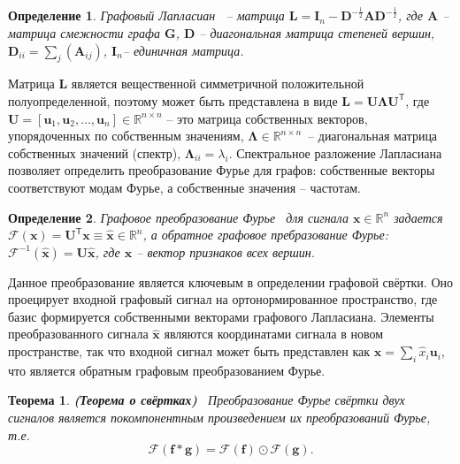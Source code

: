 \documentclass[14pt]{extarticle}
\newtheorem{Th}{Теорема}
\newtheorem{Def}{Определение}
\begin{document}
\begin{Def}
	\textit{Графовый Лапласиан}~\cite{Chung:1997} -- матрица $\mathbf{L}=\mathbf{I}_{n}-\mathbf{D}^{-\frac{1}{2}} \mathbf{A} \mathbf{D}^{-\frac{1}{2}}$, где $\mathbf{A}$ -- матрица смежности графа $\mathbf{G}$,  $\mathbf{D}$ -- диагональная матрица степеней вершин, $\mathbf{D}_{i i}=\sum_{j}\left(\mathbf{A}_{i j}\right)$, $\mathbf{I}_{n}$-- единичная матрица.
\end{Def}

Матрица $\mathbf{L}$ является вещественной симметричной положительной полуопределенной, поэтому может быть представлена в виде  $\mathbf{L}=\mathbf{U} \boldsymbol{\Lambda} \mathbf{U}^{\mathsf{T}} $, где $\mathbf{U}=\left[\mathbf{u}_{1}, \mathbf{u}_{2}, \dots, \mathbf{u}_n\right] \in \mathbb{R}^{n \times n}$ -- это матрица собственных векторов, упорядоченных по собственным значениям, $\boldsymbol{\Lambda} \in \mathbb{R}^{n \times n}$~-- диагональная матрица собственных значений (спектр), $\boldsymbol{\Lambda}_{i i}=\lambda_{i}$. Спектральное разложение Лапласиана позволяет определить преобразование Фурье для графов: собственные векторы соответствуют модам Фурье, а собственные значения -- частотам. 

\begin{Def}
	\textit{Графовое преобразование Фурье}~\cite{journals/spm/ShumanNFOV13} для сигнала $\mathbf{x} \in \mathbb{R}^{n}$ задается $\mathscr{F}(\mathbf{x})=\mathbf{U}^{\mathsf{T}} \mathbf{x} \equiv \hat{\mathbf{x}} \in \mathbb{R}^{n}$, а обратное графовое пребразование Фурье: $\mathscr{F}^{-1}(\hat{\mathbf{x}})=\mathbf{U} \hat{\mathbf{x}}$, где $\mathbf{x}$ -- вектор признаков всех вершин.
\end{Def}

Данное преобразование является ключевым в определении графовой свёртки. Оно проецирует входной графовый сигнал на ортонормированное пространство, где базис формируется собственными векторами графового Лапласиана. Элементы преобразованного сигнала $ \hat{\mathbf{x}}$ являются координатами сигнала в новом пространстве, так что входной сигнал может быть представлен как $\mathbf{x}=\sum_{i} \hat{x}_{i} \mathbf{u}_{i}$, что является обратным графовым преобразованием Фурье.

\begin{Th}
	\textbf{(Теорема о свёртках)}~\cite{10.5555/1525499} Преобразование Фурье свёртки двух сигналов является покомпонентным произведением их преобразований Фурье, т.е. $$\mathscr{F}\left( \mathbf{f} * \mathbf{g}\right) =\mathscr{F}(\mathbf{f}) \odot \mathscr{F}(\mathbf{g}).$$
	\label{conv_theorem}
\end{Th}
\end{document}
